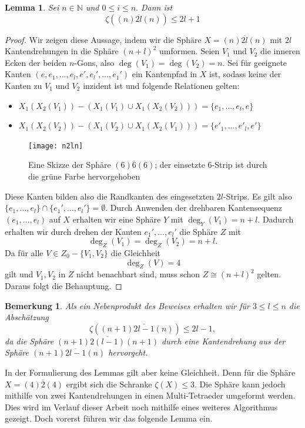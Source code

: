 \documentclass[12pt,titlepage,twoside,cleardoublepage]{article}
\theoremstyle{nummermitklammern}
\newtheorem{lemma}[temp]{Lemma}
\newtheorem{bemerkung}[temp]{Bemerkung}
\newtheorem{lemma}[zahl]{Lemma}
\newtheorem{bemerkung}[zahl]{Bemerkung}
\numberwithin{equation}{section}
\begin{document}
\begin{lemma}
Sei $n\in \mathbb{N}$ und $0\leq i \leq n.$ Dann ist 
\[
\zeta((n)\overline{2l}(n))\leq 2l+1
\]
\end{lemma}
\begin{proof}
Wir zeigen diese Aussage, indem wir die Sphäre $X=(n)\overline{2l}(n)$ mit $2l$ Kantendrehungen in die Sphäre $(n+l)^2$ umformen. Seien $V_1$ und $V_2$ die inneren Ecken der beiden $n$-Gons, also $\deg(V_1)=\deg(V_2)=n$. Sei für geeignete Kanten $(e,e_1,\ldots,e_l,e',e_l',\ldots,e_1')$ ein Kantenpfad in $X$ ist, sodass keine der Kanten zu $V_1$ und $V_2$ inzident ist und folgende Relationen gelten:
\begin{itemize}
\item $X_1(X_2(V_1))-(X_1(V_1)\cup X_1(X_2(V_2)))=\{e_1,\ldots,e_l,e\}$
\item $X_1(X_2(V_2))-(X_1(V_2)\cup X_1(X_2(V_1)))=\{e'_1,\ldots,e'_l,e'\}$
\end{itemize}
\begin{figure}[H]
\begin{center}
\texttt{[image: n2ln]}
\end{center}
\caption{Eine Skizze der Sphäre $(6)\overline{6}(6)$; der einsetzte 6-Strip ist durch die grüne Farbe hervorgehoben}
\end{figure}
Diese Kanten bilden also die Randkanten des eingesetzten $2l$-Strips.
Es gilt also $\{e_1,\ldots,e_l\}\cap\{e_1',\ldots,e_l'\}=\emptyset.$
Durch Anwenden der drehbaren Kantensequenz $(e_1,\ldots,e_l)$ auf $X$ erhalten wir eine Sphäre $Y$ mit $\deg_Y(V_1)=n+l.$ Dadurch erhalten wir durch drehen der Kanten $e_1',\ldots,e_l'$ die Sphäre $Z$ mit 
\[
\deg_Z(V_1)=\deg_Z(V_2)=n+l.
\]
Da für alle $V\in Z_0-\{V_1,V_2\}$ die Gleichheit 
\[
\deg_Z(V)=4
\]
gilt und $V_1,V_2$ in $Z$ nicht benachbart sind, muss schon $Z\cong (n+l)^2$ gelten. Daraus folgt die Behauptung.
\end{proof}
\begin{bemerkung}
Als ein Nebenprodukt des Beweises erhalten wir für $3\leq l\leq n$ die Abschätzung 
\[
\zeta((n+1)\overline{2l-1}(n))\leq 2l-1,
\]
da die Sphäre $(n+1)\overline{2(l-1)}(n+1)$ durch eine Kantendrehung aus der Sphäre $(n+1)\overline{2l-1}(n)$ hervorgeht.
\end{bemerkung}
In der Formulierung des Lemmas gilt aber keine Gleichheit.
Denn für die Sphäre $X=(4)\overline{2}(4)$ ergibt sich die Schranke $\zeta(X)\leq 3.$ Die Sphäre kann jedoch mithilfe von zwei Kantendrehungen in einen Multi-Tetraeder umgeformt werden. Dies wird im Verlauf dieser Arbeit noch mithilfe eines weiteres Algorithmus gezeigt. Doch vorerst führen wir das folgende Lemma ein.
\end{document}
